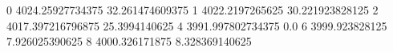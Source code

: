 0 4024.25927734375 32.261474609375
1 4022.2197265625 30.221923828125
2 4017.397216796875 25.3994140625
4 3991.997802734375 0.0
6 3999.923828125 7.926025390625
8 4000.326171875 8.328369140625

